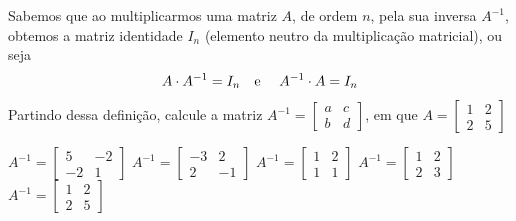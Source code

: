 Sabemos que ao multiplicarmos uma matriz $A$, de ordem $n$, pela sua inversa $A^{-1}$, obtemos a matriz identidade $I_n$ (elemento neutro da multiplicação matricial), ou seja
\[A\cdot A^{-1}=I_n\textnormal{\quad e \quad}A^{-1}\cdot A=I_n \]
Partindo dessa definição, calcule a matriz $A^{-1}=\left[ \begin{array}{cc}
a   &  c \\
b   &  d
\end{array} \right]$, em que $A = \left[ \begin{array}{cc}
1   &  2\\
2  &   5
\end{array} \right]$

$A^{-1} = \left[ \begin{array}{cc} 5  & -2\\ -2  &  1 \end{array} \right]$
$A^{-1} = \left[ \begin{array}{cc} -3  &  2\\ 2  & -1 \end{array} \right]$
$A^{-1} = \left[ \begin{array}{cc} 1   &  2\\ 1  &   1 \end{array} \right]$
$A^{-1} = \left[ \begin{array}{cc} 1  &  2\\ 2  &  3 \end{array} \right]$
$A^{-1} = \left[ \begin{array}{cc} 1   &  2\\ 2  &   5 \end{array} \right]$


